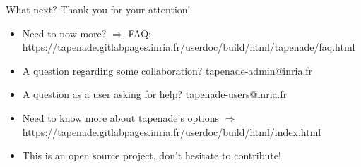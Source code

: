 \documentclass[12pt,xcolor={table}]{beamer}
\begin{document}
\begin{frame}{What next?}
  Thank you for your attention! 
  \begin{itemize}
    \item Need to now more? $\Rightarrow$ FAQ: https://tapenade.gitlabpages.inria.fr/userdoc/build/html/tapenade/faq.html
    \item A question regarding some collaboration? tapenade-admin@inria.fr
    \item A question as a user asking for help? tapenade-users@inria.fr 
    \item Need to know more about tapenade's options $\Rightarrow$ https://tapenade.gitlabpages.inria.fr/userdoc/build/html/index.html
    \item This is an open source project, don't hesitate to contribute!
  \end{itemize}
\end{frame}







\end{document}
